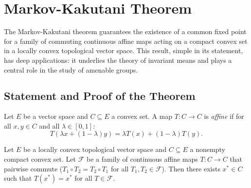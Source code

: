 \chapter{Markov-Kakutani Theorem}
\label{ch:markov_kakutani}

\begin{intuition}
The Markov-Kakutani theorem guarantees the existence of a common fixed point for a family
of commuting continuous affine maps acting on a compact convex set in a locally convex
topological vector space. This result, simple in its statement, has deep applications: it
underlies the theory of invariant means and plays a central role in the study of amenable
groups.
\end{intuition}

\section{Statement and Proof of the Theorem}

\begin{definition}
Let $E$ be a vector space and $C \subseteq E$ a convex set. A map $T\colon C \to C$ is
\emph{affine} if for all $x, y \in C$ and all $\lambda \in [0,1]$:
\[
  T(\lambda x + (1-\lambda)y) = \lambda T(x) + (1-\lambda) T(y).
\]
\end{definition}

\begin{theorem}
\label{thm:markov-kakutani}
Let $E$ be a locally convex topological vector space and $C \subseteq E$ a nonempty compact
convex set. Let $\mathcal{F}$ be a family of continuous affine maps $T\colon C \to C$ that
pairwise commute ($T_1 \circ T_2 = T_2 \circ T_1$ for all $T_1, T_2 \in \mathcal{F}$).
Then there exists $x^* \in C$ such that $T(x^*) = x^*$ for all $T \in \mathcal{F}$.
\end{theorem}

